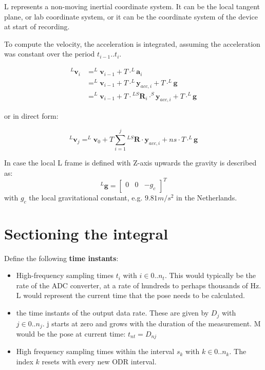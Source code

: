 \documentclass{article}
\begin{document}
L represents a non-moving inertial coordinate system. It can be the local tangent plane,  or lab coordinate system, or it can be the coordinate system of the device at start of recording.

To compute the velocity, the acceleration is integrated, assuming the acceleration was constant over the period $t_{i-1}..t_i$.

\begin{equation} \label{eq:acceleration_integration}
\begin{aligned}
^L\textbf{v}_i &= ^L\textbf{v}_{i-1} + T \cdot ^L\boldsymbol{a}_i \\
&=  ^L\textbf{v}_{i-1} + T \cdot ^L\boldsymbol{y}_{acc,i} + T \cdot ^L \boldsymbol{g} \\
&=  ^L\textbf{v}_{i-1} + T \cdot{}^{LS}\boldsymbol{R}_i \cdot ^S\boldsymbol{y}_{acc,i} + T \cdot ^L \boldsymbol{g}
\end{aligned} 
\end{equation}

or in direct form:

\begin{equation} \label{eq:acceleration_integration_sum}
^L\textbf{v}_{j}= ^L\textbf{v}_0 + T \sum_{i=1}^{j} {}^{LS}\boldsymbol{R} \cdot \boldsymbol{y}_{acc,i} +ns \cdot T \cdot ^L\boldsymbol{g}
\end{equation}

In case the local L frame is defined with Z-axis upwards  the gravity is described as:
\begin{equation} \label{eq:gravity_down}
^L\textbf{g} = \begin{bmatrix} 0 & 0 & -g_c \end{bmatrix}^T
\end{equation}
with $g_c$ the local gravitational constant, e.g. $9.81 m/s^2$ in the Netherlands.

\section{Sectioning the integral}

Define the following \textbf{time instants}:
\begin{itemize}
\item High-frequency sampling times $t_i$ with  $i \in 0..n_t$. This would typically be the rate of the ADC converter, at a rate of hundreds to perhaps thousands of Hz. L would represent the current time that the pose needs to be calculated.
\item the time instants of the output data rate. These are given by $D_j$ with  $j \in 0..n_j$. j starts at zero and grows with the duration of the measurement. M would be the pose at current time: $t_{nt}=D_{nj}$
\item High frequency sampling times within the interval $s_k$ with  $k \in 0..n_k$. The index $k$ resets with every new ODR interval.
\end{itemize}
\end{document}
